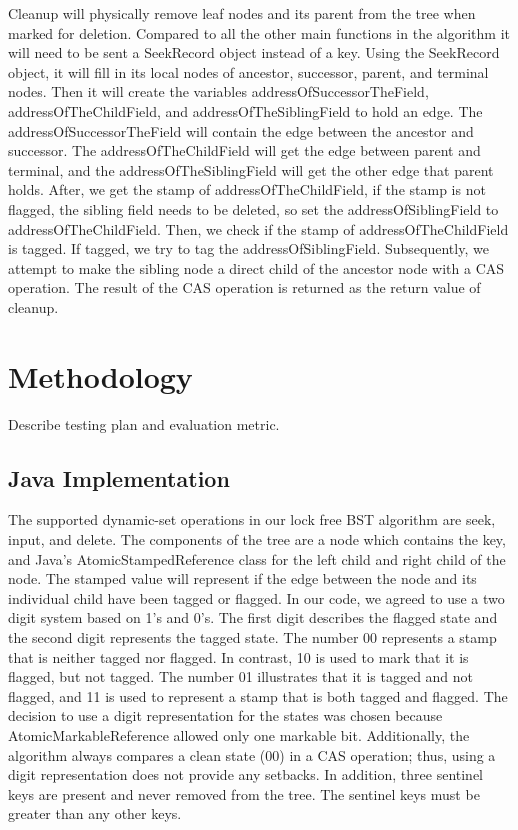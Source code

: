 \documentclass[conference]{IEEEtran}
\begin{document}
Cleanup will physically remove leaf nodes and its parent from the tree when marked for deletion. Compared to all the other main functions in the algorithm it will need to be sent a SeekRecord object instead of a key. Using the SeekRecord object, it will fill in its local nodes of ancestor, successor, parent, and terminal nodes. Then it will create the variables addressOfSuccessorTheField, addressOfTheChildField, and addressOfTheSiblingField to hold an edge. The addressOfSuccessorTheField will contain the edge between the ancestor and successor. The addressOfTheChildField will get the edge between parent and terminal, and the addressOfTheSiblingField will get the other edge that parent holds. After, we get the stamp of addressOfTheChildField, if the stamp is not flagged, the sibling field needs to be deleted, so set the addressOfSiblingField to addressOfTheChildField. Then, we check if the stamp of addressOfTheChildField is tagged. If tagged, we try to tag the addressOfSiblingField. Subsequently, we attempt to make the sibling node a direct child of the ancestor node with a CAS operation. The result of the CAS operation is returned as the return value of cleanup.

\section{Methodology}
Describe testing plan and evaluation metric.
\subsection{Java Implementation}\label{AA}
The supported dynamic-set operations in our lock free BST algorithm are seek, input, and delete. The components of the tree are a node which contains the key, and Java’s AtomicStampedReference class for the left child and right child of the node. The stamped value will represent if the edge between the node and its individual child have been tagged or flagged. In our code, we agreed to use a two digit system based on 1’s and 0’s. The first digit describes the flagged state and the second digit represents the tagged state. The number 00 represents a stamp that is neither tagged nor flagged. In contrast, 10 is used to mark that it is flagged, but not tagged. The number 01 illustrates that it is tagged and not flagged, and 11 is used to represent a stamp that is both tagged and flagged. The decision to use a digit representation for the states was chosen because AtomicMarkableReference allowed only one markable bit. Additionally, the algorithm always compares a clean state (00) in a CAS operation; thus, using a digit representation does not provide any setbacks. In addition, three sentinel keys are present and never removed from the tree. The sentinel keys must be greater than any other keys.
\end{document}
